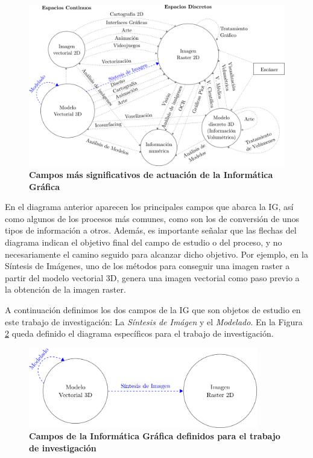 \begin{figure}[h]
\includegraphics[width=16cm]{Img/CPD/grafica1.png}
\centering
\caption{\textbf{\footnotesize{Campos más significativos de actuación de la Informática Gráfica}}}
\label{fig:grafica1}
\end{figure}

En el diagrama anterior aparecen los principales campos que abarca la IG, así como algunos de los procesos más comunes, como son los de conversión de unos tipos de información a otros. Además, es importante señalar que las flechas del diagrama indican el objetivo final del campo de estudio o del proceso, y no necesariamente el camino seguido para alcanzar dicho objetivo. Por ejemplo, en la Síntesis de Imágenes, uno de los métodos para conseguir una imagen raster a partir del modelo vectorial 3D, genera una imagen vectorial como paso previo a la obtención de la imagen raster.

A continuación definimos los dos campos de la IG que son objetos de estudio en este trabajo de investigación: La \textit{Síntesis de Imágen} y el \textit{Modelado}. En la Figura \ref{fig:grafica2} queda definido el diagrama específicos para el trabajo de investigación.



\begin{figure}[h]
\includegraphics[width=10cm]{Img/CPD/grafica2.png}
\centering
\caption{\textbf{\footnotesize{Campos de la Informática Gráfica definidos para el trabajo de investigación}}}
\label{fig:grafica2}
\end{figure}


